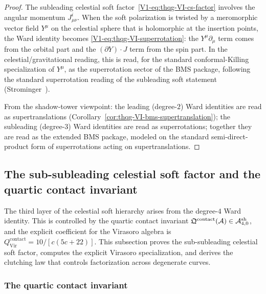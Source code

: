 \begin{proof}
The subleading celestial soft factor~\eqref{V1-eq:thqg-VI-cs-factor} involves
the angular momentum $J^i_{\mu\nu}$. When the soft polarization
is twisted by a meromorphic vector field $Y^\mu$ on the celestial
sphere that is holomorphic at the insertion points, the Ward identity becomes
\eqref{V1-eq:thqg-VI-superrotation}: the $Y^\mu\partial_\mu$ term
comes from the orbital part and the $(\partial Y)\cdot J$ term
from the spin part. In the celestial/gravitational reading, this is
read, for the standard conformal-Killing specialization of $Y^\mu$,
as the superrotation sector of the BMS package, following the
standard superrotation reading of the subleading soft statement
(Strominger~\cite{Strominger18}).

From the shadow-tower viewpoint: the leading (degree-$2$) Ward
identities are read as supertranslations
(Corollary~\ref{cor:thqg-VI-bms-supertranslation}); the
subleading (degree-$3$) Ward identities are read as superrotations;
together they are read as the extended BMS package, modeled on the
standard semi-direct-product form of superrotations acting on
supertranslations.
\end{proof}

%
%

\subsection{The sub-subleading celestial soft factor and the quartic contact
invariant}
\label{subsec:thqg-VI-sub-subleading-soft}

The third layer of the celestial soft hierarchy arises from the
degree-$4$ Ward identity. This is controlled by the quartic
contact invariant
$\mathfrak{Q}^{\mathrm{contact}}(\mathcal{A}) \in \mathcal{A}^{\mathrm{sh}}_{4,0}$,
and the explicit coefficient for the Virasoro algebra is
$Q^{\mathrm{contact}}_{\mathrm{Vir}} = 10/[c(5c+22)]$. This
subsection proves the sub-subleading celestial soft factor,
computes the explicit Virasoro specialization, and derives the
clutching law that controls factorization across degenerate curves.

\subsubsection{The quartic contact invariant}

